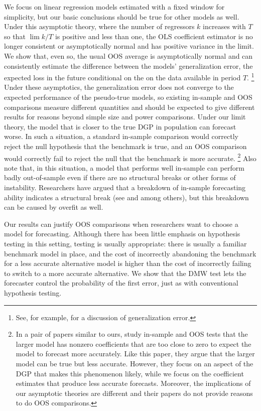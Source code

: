 \documentclass[11pt]{article}
\begin{document}
We focus on linear regression models estimated with a fixed window
for simplicity, but our basic
conclusions should be true for other models as well.  Under this
asymptotic theory, where the number of regressors $k$ increases with $T$
so that $\lim k/T$ is positive and less than one,
the OLS coefficient estimator is no longer
consistent or asymptotically normal \citep{Hub:73} and has positive
variance in the limit.  We show that, even so, the usual OOS average
is asymptotically normal and can consistently estimate the difference
between the models' generalization error, the expected loss in the
future conditional on the on the data available in period
$T$.%
\footnote{See, for example, \citet{HTF:08} for a discussion of
  generalization error.} %
Under these asymptotics, the generalization
error does not converge to the expected performance of the pseudo-true
models, so existing in-sample and OOS comparisons measure different
quantities and should be expected to give different results for
reasons beyond simple size and power comparisons.  Under our limit theory,
the model that is closer to the true DGP in population can forecast
worse.  In such a situation, a standard in-sample comparison would
correctly reject the null hypothesis that the benchmark is true, and
an OOS comparison would correctly fail to reject the null that the
benchmark is more accurate.%
\footnote{In a pair of papers similar to
  ours, \citet{ClM:12,ClM:12b} study in-sample and OOS tests that
  the larger model has nonzero coefficients that are too close to zero
  to expect the model to forecast more accurately.  Like this paper,
  they argue that the larger model can be true but less accurate.
  However, they focus on an aspect of the DGP that makes this
  phenomenon likely, while we focus on the coefficient estimates that
  produce less accurate forecasts.  Moreover, the implications of our
  asymptotic theories are different and their papers do not provide
  reasons to do OOS comparisons.} %
Also note that, in this situation, a model that performs well
in-sample can perform badly out-of-sample even if there are no
structural breaks or other forms of instability.  Researchers
have argued that a breakdown of in-sample forecasting ability
indicates a structural break (see \citealp{BoH:99} and
\citealp{StW:03} among others), but this breakdown can be caused by overfit as
well.

Our results can justify OOS comparisons when researchers want to
choose a model for forecasting.  Although there has been little
emphasis on hypothesis testing in this setting, testing is usually
appropriate: there is usually a familiar benchmark model in place, and
the cost of incorrectly abandoning the benchmark for a less accurate
alternative model is higher than the cost of incorrectly failing to
switch to a more accurate alternative.  We show that the DMW test
lets the forecaster control the probability of the first error, just
as with conventional hypothesis testing.
\end{document}

